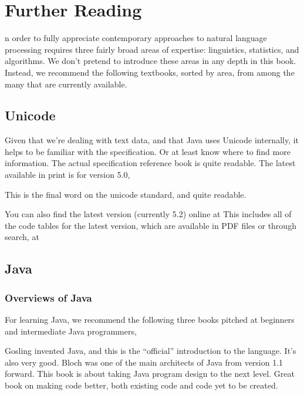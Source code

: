 \chapter{Further Reading}\label{appendix:reading}

n order to fully appreciate contemporary approaches to natural language
processing requires three fairly broad areas of expertise:
linguistics, statistics, and algorithms.  We don't pretend to
introduce these areas in any depth in this book.  Instead, we
recommend the following textbooks, sorted by area, from among the many
that are currently available.

\section{Unicode}

Given that we're dealing with text data, and that Java uses Unicode
internally, it helps to be familiar with the specification.  Or at
least know where to find more information.  The actual specification
reference book is quite readable.  The latest available in print is
for version 5.0,
%
\begin{itemize}
{This is the final word on the unicode standard, and
quite readable.}
\end{itemize}
%
You can also find the latest version (currently 5.2) online at
%
%
This includes all of the code tables for the latest version, which are
available in PDF files or through search, at 
%
\begin{quote}
\end{quote}


\section{Java}\label{section:reading-java}

\subsection{Overviews of Java}
%
For learning Java, we recommend the following three books pitched at
beginners and intermediate Java programmers,
%
\begin{itemize}
{Gosling invented Java, and this is the ``official'' introduction to the
language.  It's also very good.}
%
{Bloch was one of the main architects of Java from
version 1.1 forward.  This book is about taking Java program design
to the next level.}
%
{Great book on making code better, both existing
code and code yet to be created.}
\end{itemize}
%

